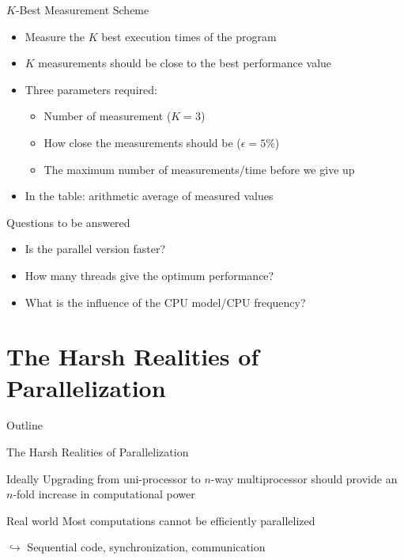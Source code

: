 \begin{frame}{$K$-Best Measurement Scheme}
  \begin{itemize}
  \item Measure the $K$ best execution times of the program
  \item $K$ measurements should be close to the best performance value
  \item Three parameters required:
    \begin{itemize}
    \item Number of measurement ($K = 3$)
    \item How close the measurements should be ($\epsilon = 5\%$)
    \item The maximum number of measurements/time before we give up
    \end{itemize}
  \item In the table: arithmetic average of measured values
  \end{itemize}
\end{frame}

\begin{frame}{Questions to be answered}
  \begin{itemize}
  \item Is the parallel version faster?
  \item How many threads give the optimum performance?
  \item What is the influence of the CPU model/CPU frequency?
  \end{itemize}
\end{frame}


\section{The Harsh Realities of Parallelization}

\begin{frame}{Outline}
  \tableofcontents[current]
\end{frame}

\begin{frame}{The Harsh Realities of Parallelization}
  \begin{exampleblock}{Ideally}
    Upgrading from uni-processor to $n$-way multiprocessor should
    provide an $n$-fold increase in computational power
  \end{exampleblock}


  \begin{alertblock}{Real world}
    Most computations cannot be efficiently parallelized 

    $\hookrightarrow$ Sequential code, synchronization, communication
  \end{alertblock}

\end{frame}

